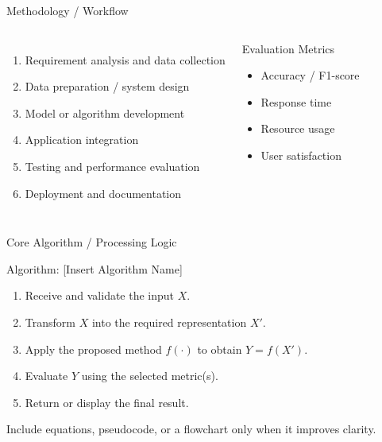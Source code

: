 \documentclass[aspectratio=169,11pt]{beamer}
\begin{document}
\begin{frame}{Methodology / Workflow}
  \begin{columns}[T,onlytextwidth]
      \begin{enumerate}
        \item Requirement analysis and data collection
        \item Data preparation / system design
        \item Model or algorithm development
        \item Application integration
        \item Testing and performance evaluation
        \item Deployment and documentation
      \end{enumerate}
      \begin{block}{Evaluation Metrics}
        \begin{itemize}
          \item Accuracy / F1-score
          \item Response time
          \item Resource usage
          \item User satisfaction
        \end{itemize}
      \end{block}
  \end{columns}
\end{frame}

\begin{frame}{Core Algorithm / Processing Logic}
  \begin{block}{Algorithm: [Insert Algorithm Name]}
    \begin{enumerate}
      \item Receive and validate the input $X$.
      \item Transform $X$ into the required representation $X'$.
      \item Apply the proposed method $f(\cdot)$ to obtain $Y=f(X')$.
      \item Evaluate $Y$ using the selected metric(s).
      \item Return or display the final result.
    \end{enumerate}
  \end{block}
  \vspace{0.2cm}
  \small Include equations, pseudocode, or a flowchart only when it improves clarity.
\end{frame}
\end{document}
